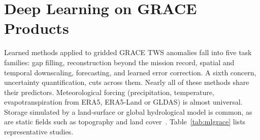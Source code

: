 \section{Deep Learning on GRACE Products}
\label{sec:mlgrace}

Learned methods applied to gridded GRACE TWS anomalies fall into five task families: gap filling, reconstruction beyond the mission record, spatial and temporal downscaling, forecasting, and learned error correction. A sixth concern, uncertainty quantification, cuts across them. Nearly all of these methods share their predictors. Meteorological forcing (precipitation, temperature, evapotranspiration from ERA5, ERA5-Land or GLDAS) is almost universal. Storage simulated by a land-surface or global hydrological model is common, as are static fields such as topography and land cover~\cite{sun2019combining,mo2022bayesian,gou2024global}. Table~\ref{tab:mlgrace} lists representative studies.

